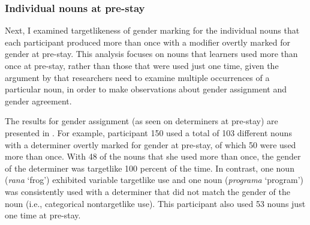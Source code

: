\documentclass[output=paper,colorlinks,citecolor=brown,modfonts,nonflat]{../langscibook}
\begin{document}
\subsubsection{Individual nouns at pre-stay}\label{sec:gudmestad:3.2.2}

Next, I examined targetlikeness of gender marking for the individual nouns that each participant produced more than once with a modifier overtly marked for gender at pre-stay.  This analysis focuses on nouns that learners used more than once at pre-stay, rather than those that were used just one time, given the argument by \citet[242]{Gudmundson2013} that researchers need to examine multiple occurrences of a particular noun, in order to make observations about gender assignment and gender agreement. 



The results for gender assignment (as seen on determiners at pre-stay) are presented in . For example, participant 150 used a total of 103 different nouns with a determiner overtly marked for gender at pre-stay, of which 50 were used more than once. With 48 of the nouns that she used more than once, the gender of the determiner was targetlike 100 percent of the time. In contrast, one noun (\textit{rana} ‘frog’) exhibited variable targetlike use and one noun (\textit{programa} ‘program’) was consistently used with a determiner that did not match the gender of the noun (i.e., categorical nontargetlike use). This participant also used 53 nouns just one time at pre-stay.
\end{document}
